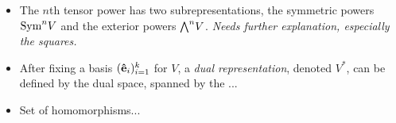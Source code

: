 \begin{itemize}
	
	
	
	\item The $n$th tensor power has two subrepresentations, the symmetric powers $\text{Sym}^n V$ and the exterior powers ${\bigwedge}^n V$. \textit{Needs further explanation, especially the squares.}
	\item After fixing a basis $(\mathbf{\hat{e}}_i)_{i=1}^k$ for $V$, a \emph{dual representation}, denoted $V^*$, can be defined by the dual space, spanned by the ...
	
	\item Set of homomorphisms...
\end{itemize}
